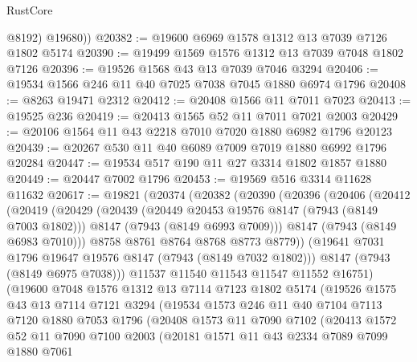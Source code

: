 \begin{lexlean}{RustCore}
\begin{coremodule}
          @8192)
        @19680))
@20382 := @19600 @6969 @1578 @1312 @13 @7039 @7126 @1802 @5174
@20390 := @19499 @1569 @1576 @1312 @13 @7039 @7048 @1802 @7126
@20396 := @19526 @1568 @43 @13 @7039 @7046 @3294
@20406 := @19534 @1566 @246 @11 @40 @7025 @7038 @7045 @1880 @6974 @1796
@20408 := @8263 @19471 @2312
@20412 := @20408 @1566 @11 @7011 @7023
@20413 := @19525 @236
@20419 := @20413 @1565 @52 @11 @7011 @7021 @2003
@20429 := @20106 @1564 @11 @43 @2218 @7010 @7020 @1880 @6982 @1796 @20123
@20439 := @20267 @530 @11 @40 @6089 @7009 @7019 @1880 @6992 @1796 @20284
@20447 := @19534 @517 @190 @11 @27 @3314 @1802 @1857 @1880
@20449 := @20447 @7002 @1796
@20453 := @19569 @516 @3314 @11628 @11632
@20617 := @19821
    (@20374
      (@20382
        (@20390
          (@20396
            (@20406
              (@20412
                (@20419
                  (@20429
                    (@20439
                      (@20449 @20453 @19576 @8147 (@7943 (@8149 @7003 @1802)))
                      @8147
                      (@7943 (@8149 @6993 @7009)))
                    @8147
                    (@7943 (@8149 @6983 @7010)))
                  @8758
                  @8761
                  @8764
                  @8768
                  @8773
                  @8779))
              (@19641 @7031 @1796 @19647 @19576 @8147 (@7943 (@8149 @7032 @1802)))
              @8147
              (@7943 (@8149 @6975 @7038)))
            @11537
            @11540
            @11543
            @11547
            @11552
            @16751)
          (@19600
            @7048
            @1576
            @1312
            @13
            @7114
            @7123
            @1802
            @5174
            (@19526
              @1575
              @43
              @13
              @7114
              @7121
              @3294
              (@19534
                @1573
                @246
                @11
                @40
                @7104
                @7113
                @7120
                @1880
                @7053
                @1796
                (@20408
                  @1573
                  @11
                  @7090
                  @7102
                  (@20413
                    @1572
                    @52
                    @11
                    @7090
                    @7100
                    @2003
                    (@20181
                      @1571
                      @11
                      @43
                      @2334
                      @7089
                      @7099
                      @1880
                      @7061

\end{coremodule}
\end{lexlean}
